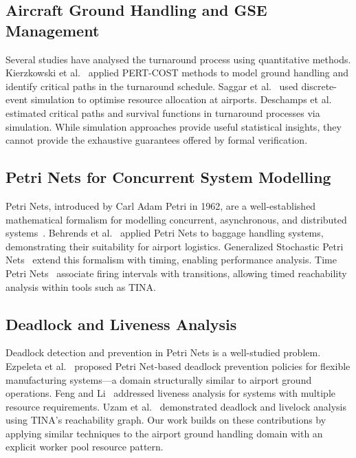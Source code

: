 \documentclass[conference,a4paper]{IEEEtran}
\begin{document}
\subsection{Aircraft Ground Handling and GSE Management}

Several studies have analysed the turnaround process using quantitative
methods. Kierzkowski et al.~\cite{ref11} applied PERT-COST methods to model
ground handling and identify critical paths in the turnaround schedule.
Saggar et al.~\cite{ref8} used discrete-event simulation to optimise
resource allocation at airports. Deschamps et al.~\cite{ref15} estimated
critical paths and survival functions in turnaround processes via
simulation. While simulation approaches provide useful statistical insights,
they cannot provide the exhaustive guarantees offered by formal verification.

\subsection{Petri Nets for Concurrent System Modelling}

Petri Nets, introduced by Carl Adam Petri in 1962, are a well-established
mathematical formalism for modelling concurrent, asynchronous, and
distributed systems~\cite{ref9}. Behrends et al.~\cite{ref12} applied Petri
Nets to baggage handling systems, demonstrating their suitability for
airport logistics. Generalized Stochastic Petri Nets~\cite{ref10} extend
this formalism with timing, enabling performance analysis. Time Petri
Nets~\cite{ref14} associate firing intervals with transitions, allowing
timed reachability analysis within tools such as TINA.

\subsection{Deadlock and Liveness Analysis}

Deadlock detection and prevention in Petri Nets is a well-studied
problem. Ezpeleta et al.~\cite{ref13} proposed Petri Net-based deadlock
prevention policies for flexible manufacturing systems---a domain structurally
similar to airport ground operations. Feng and Li~\cite{ref16} addressed
liveness analysis for systems with multiple resource requirements. Uzam
et al.~\cite{ref17} demonstrated deadlock and livelock analysis using TINA's
reachability graph. Our work builds on these contributions by applying
similar techniques to the airport ground handling domain with an explicit
worker pool resource pattern.
\end{document}
